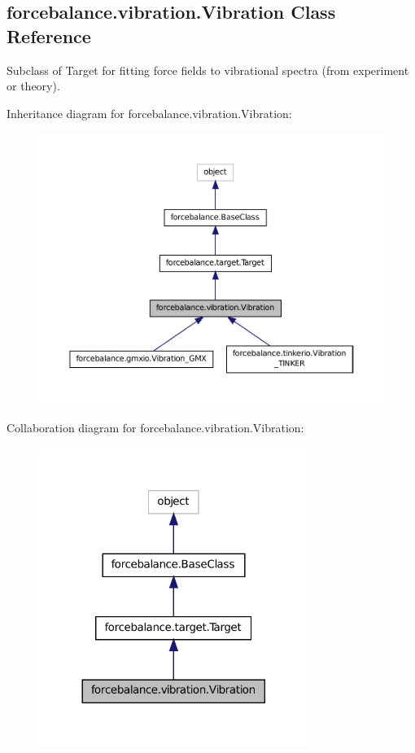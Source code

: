 \hypertarget{classforcebalance_1_1vibration_1_1Vibration}{\subsection{forcebalance.\-vibration.\-Vibration Class Reference}
\label{classforcebalance_1_1vibration_1_1Vibration}
}


Subclass of Target for fitting force fields to vibrational spectra (from experiment or theory).  




Inheritance diagram for forcebalance.\-vibration.\-Vibration\-:
\nopagebreak
\begin{figure}[H]
\begin{center}
\leavevmode
\includegraphics[width=350pt]{classforcebalance_1_1vibration_1_1Vibration__inherit__graph}
\end{center}
\end{figure}


Collaboration diagram for forcebalance.\-vibration.\-Vibration\-:
\nopagebreak
\begin{figure}[H]
\begin{center}
\leavevmode
\includegraphics[width=248pt]{classforcebalance_1_1vibration_1_1Vibration__coll__graph}
\end{center}
\end{figure}
